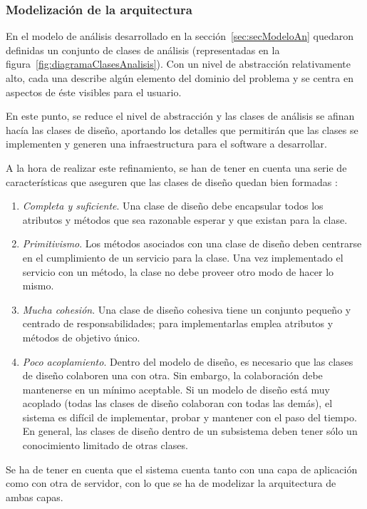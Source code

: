 \subsubsection{Modelización de la arquitectura}

En el modelo de análisis desarrollado en la sección~\ref{sec:secModeloAn} quedaron definidas un conjunto de clases de análisis (representadas en la figura~\ref{fig:diagramaClasesAnalisis}). Con un nivel de abstracción relativamente alto, cada una describe algún elemento del dominio del problema y se centra en aspectos de éste visibles para el usuario.

En este punto, se reduce el nivel de abstracción y las clases de análisis se afinan hacía las clases de diseño, aportando los detalles que permitirán que las clases se implementen y generen una infraestructura para el software a desarrollar.

A la hora de realizar este refinamiento, se han de tener en cuenta una serie de características que aseguren que las clases de diseño quedan bien formadas \cite{Arl02}:

\begin{enumerate}
	\item \textit{Completa y suficiente}. Una clase de diseño debe encapsular todos los atributos y métodos que sea razonable esperar y que existan para la clase.
	\item \textit{Primitivismo}. Los métodos asociados con una clase de diseño deben centrarse en el cumplimiento de un servicio para la clase. Una vez implementado el servicio con un método, la
	clase no debe proveer otro modo de hacer lo mismo.
	\item \textit{Mucha cohesión}. Una clase de diseño cohesiva tiene un conjunto pequeño y centrado de	responsabilidades; para implementarlas emplea atributos y métodos de objetivo único.
	\item \textit{Poco acoplamiento}. Dentro del modelo de diseño, es necesario que las clases de diseño colaboren una con otra. Sin embargo, la colaboración debe mantenerse en un mínimo aceptable. Si un modelo de diseño está muy acoplado (todas las clases de diseño colaboran con todas las demás), el sistema es difícil de implementar, probar y mantener con el paso del tiempo. En general, las clases de diseño dentro de un subsistema deben tener sólo un conocimiento limitado de otras clases.
\end{enumerate}

Se ha de tener en cuenta que el sistema cuenta tanto con una capa de aplicación como con otra de servidor, con lo que se ha de modelizar la arquitectura de ambas capas.

